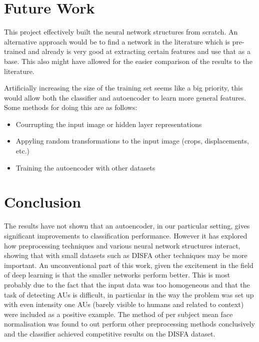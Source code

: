   \section{Future Work}
    This project effectively built the neural network structures from scratch.
    An alternative approach would be to find a network in the literature which
    is pre-trained and already is very good at extracting certain features and
    use that as a base. This also might have allowed for the easier comparison
    of the results to the literature.

    Artificially increasing the size of the training set seems like a big
    priority, this would allow both the classifier and autoencoder to learn more
    general features. Some methods for doing this are as follows:

    \begin{itemize}
      \item Courrupting the input image or hidden layer representations
      \item Appyling random transformations to the input image (crops, displacements, etc.)
      \item Training the autoencoder with other datasets
    \end{itemize}


  \section{Conclusion}
    The results have not shown that an autoencoder, in our particular setting,
    gives significant improvements to classification performance. However it has
    explored how preprocessing techniques and various neural network structures
    interact, showing that with small datasets such as DISFA other techniques
    may be more important. An unconventional part of this work, given the
    excitement in the field of deep learning is that the smaller networks
    perform better. This is most probably due to the fact that the input data
    was too homogeneous and that the task of detecting AUs is difficult, in
    particular in the way the problem was set up with even intensity one AUs
    (barely visible to humans and related to context) were included as a
    positive example. The method of per subject mean face normalisation was
    found to out perform other preprocessing methods conclusively and the
    classifier achieved competitive results on the DISFA dataset.

